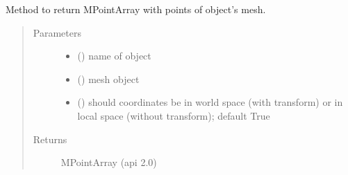 \documentclass[letterpaper,10pt,english]{sphinxmanual}
\begin{document}

\begin{fulllineitems}
\label{\detokenize{pk_src.misc:pk_src.misc.getPoints}}
Method to return MPointArray with points of object’s mesh.
\begin{quote}\begin{description}
\item[{Parameters}] \leavevmode\begin{itemize}
\item {} 
 () \textendash{} name of object

\item {} 
 () \textendash{} mesh object

\item {} 
 () \textendash{} should coordinates be in world space (with transform) or in local space (without transform); default True

\end{itemize}

\item[{Returns}] \leavevmode
MPointArray (api 2.0)


\end{description}
\end{quote}
\end{fulllineitems}
\end{document}
